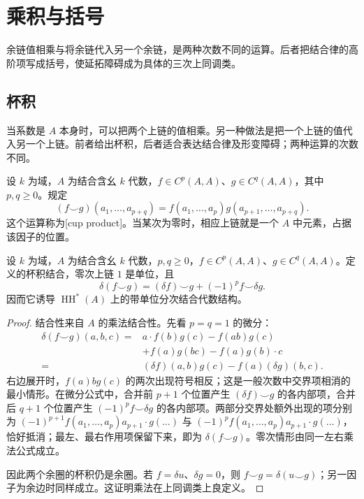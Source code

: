 
\section{乘积与括号}
\label{b4:sec:1203}

余链值相乘与将余链代入另一个余链，是两种次数不同的运算。后者把结合律的高阶项写成括号，使延拓障碍成为具体的三次上同调类。

%
%

\subsection{杯积}
\label{b4:subsec:1203:01}

当系数是 \(A\) 本身时，可以把两个上链的值相乘。另一种做法是把一个上链的值代入另一个上链。前者给出杯积，后者适合表达结合律及形变障碍；两种运算的次数不同。

\begin{definition}\label{b4:def:hochschild-cup}
	设 \(k\) 为域，\(A\) 为结合含幺 \(k\) 代数，\(f\in C^p(A,A)\)、\(g\in C^q(A,A)\)，其中 \(p,q\ge0\)。规定
	\[
		(f\smile g)(a_1,\ldots,a_{p+q}) =f(a_1,\ldots,a_p)g(a_{p+1},\ldots,a_{p+q}).
	\]
	这个运算称为[cup product]。当某次为零时，相应上链就是一个 \(A\) 中元素，占据该因子的位置。
\end{definition}

\begin{proposition}\label{b4:prop:hochschild-cup-differential}
	设 \(k\) 为域，\(A\) 为结合含幺 \(k\) 代数，\(p,q\ge0\)，\(f\in C^p(A,A)\)、\(g\in C^q(A,A)\)。定义的杯积结合，零次上链 \(1\) 是单位，且
	\[
		\delta(f\smile g)=(\delta f)\smile g+(-1)^p f\smile\delta g.
	\]
	因而它诱导 \(\operatorname{HH}^*(A)\) 上的带单位分次结合代数结构。
\end{proposition}
\begin{proof}
	结合性来自 \(A\) 的乘法结合性。先看 \(p=q=1\) 的微分：
	\[
		\begin{aligned}
			\delta(f\smile g)(a,b,c) ={}&a\cdot f(b)g(c)-f(ab)g(c)\\
			&+f(a)g(bc)-f(a)g(b)\cdot c\\
			={}&(\delta f)(a,b)g(c)-f(a)(\delta g)(b,c).
		\end{aligned}
	\]
	右边展开时，\(f(a)b g(c)\) 的两次出现符号相反；这是一般次数中交界项相消的最小情形。在微分公式中，合并前 \(p+1\) 个位置产生 \((\delta f)\smile g\) 的各内部项，合并后 \(q+1\) 个位置产生 \((-1)^pf\smile\delta g\) 的各内部项。两部分交界处额外出现的项分别为 \((-1)^{p+1}f(a_1,\ldots,a_p)a_{p+1}\cdot g(\ldots)\) 与 \((-1)^pf(a_1,\ldots,a_p)a_{p+1}\cdot g(\ldots)\)，恰好抵消；最左、最右作用项保留下来，即为 \(\delta(f\smile g)\)。零次情形由同一左右乘法公式成立。

	因此两个余圈的杯积仍是余圈。若 \(f=\delta u\)、\(\delta g=0\)，则 \(f\smile g=\delta(u\smile g)\)；另一因子为余边时同样成立。这证明乘法在上同调类上良定义。
\end{proof}

